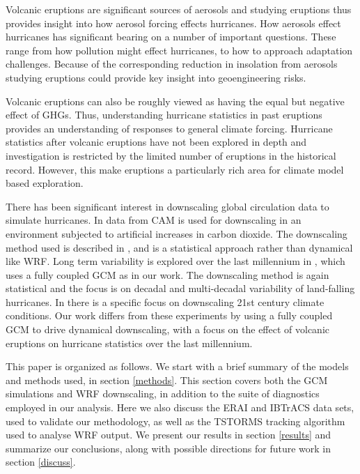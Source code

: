 \par
Volcanic eruptions are significant sources of aerosols and studying eruptions thus provides insight into how aerosol forcing effects hurricanes. How aerosols effect hurricanes has significant bearing on a number of important questions. These range from how pollution might effect hurricanes, to how to approach adaptation challenges. Because of the corresponding reduction in insolation from aerosols studying eruptions could provide key insight into geoengineering risks. 
\par
Volcanic eruptions can also be roughly viewed as having the equal but negative effect of GHGs. Thus, understanding hurricane statistics in past eruptions provides an understanding of responses to general climate forcing. Hurricane statistics after volcanic eruptions have not been explored in depth and investigation is restricted by the limited number of eruptions in the historical record. However, this make eruptions a particularly rich area for climate model based exploration. 
\par 
There has been significant interest in downscaling global circulation data to simulate hurricanes. In \cite{cam_down_ke} data from CAM is used for downscaling in an environment subjected to artificial increases in carbon dioxide. The downscaling method used is described in \cite{down_method_ke}, and is a statistical approach rather than dynamical like WRF. Long term variability is explored over the last millennium in \cite{lme_down_ke}, which uses a fully coupled GCM as in our work. The downscaling method is again statistical and the focus is on decadal and multi-decadal variability of land-falling hurricanes. In \cite{down_21st_gv} there is a specific focus on downscaling 21st century climate conditions. Our work differs from these experiments by using a fully coupled GCM to drive dynamical downscaling, with a focus on the effect of volcanic eruptions on hurricane statistics over the last millennium.
\par
This paper is organized as follows. We start with a brief summary of the models and methods used, in section \ref{methods}. This section covers both the GCM simulations and WRF downscaling, in addition to the suite of diagnostics employed in our analysis. Here we also discuss the ERAI and IBTrACS data sets, used to validate our methodology, as well as the TSTORMS tracking algorithm used to analyse WRF output. We present our results in section \ref{results} and summarize our conclusions, along with possible directions for future work in section \ref{discuss}.     

